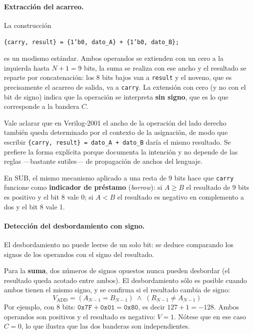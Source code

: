 \documentclass[12pt,a4paper]{article}
\begin{document}
\paragraph{Extracción del acarreo.} La construcción
\begin{center}
\texttt{\{carry, result\} = \{1'b0, dato\_A\} + \{1'b0, dato\_B\};}
\end{center}
es un modismo estándar. Ambos operandos se extienden con un cero a la izquierda hasta
$N+1 = 9$ bits, la suma se realiza con ese ancho y el resultado se reparte por
concatenación: los 8 bits bajos van a \texttt{result} y el noveno, que es precisamente el
acarreo de salida, va a \texttt{carry}. La extensión con cero (y no con el bit de signo)
indica que la operación se interpreta \textbf{sin signo}, que es lo que corresponde a la
bandera $C$.

Vale aclarar que en Verilog-2001 el ancho de la operación del lado derecho también queda
determinado por el contexto de la asignación, de modo que escribir
\texttt{\{carry, result\} = dato\_A + dato\_B} daría el mismo resultado. Se prefiere la
forma explícita porque documenta la intención y no depende de las reglas ---bastante
sutiles--- de propagación de anchos del lenguaje.

En SUB, el mismo mecanismo aplicado a una resta de 9 bits hace que \texttt{carry} funcione
como \textbf{indicador de préstamo} (\textit{borrow}): si $A \geq B$ el resultado de 9 bits
es positivo y el bit 8 vale 0; si $A < B$ el resultado es negativo en complemento a dos y
el bit 8 vale 1.

\paragraph{Detección del desbordamiento con signo.} El desbordamiento no puede leerse de un
solo bit: se deduce comparando los signos de los operandos con el signo del resultado.

Para la \textbf{suma}, dos números de signos opuestos nunca pueden desbordar (el resultado
queda acotado entre ambos). El desbordamiento sólo es posible cuando ambos tienen el mismo
signo, y se confirma si el resultado cambia de signo:
$$V_{\text{ADD}} = (A_{N-1} = B_{N-1}) \;\wedge\; (R_{N-1} \neq A_{N-1})$$
Por ejemplo, con 8 bits: $\texttt{0x7F} + \texttt{0x01} = \texttt{0x80}$, es decir
$127 + 1 = -128$. Ambos operandos son positivos y el resultado es negativo: $V=1$. Nótese
que en ese caso $C=0$, lo que ilustra que las dos banderas son independientes.
\end{document}
